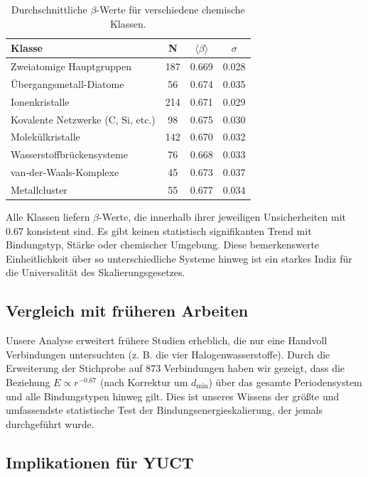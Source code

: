 \documentclass[12pt,a4paper]{article}
\begin{document}
	\begin{table}[htbp]
		\centering
		\caption{Durchschnittliche \(\beta\)-Werte für verschiedene chemische Klassen.}
		\label{tab:beta_by_class}
		\begin{tabular}{lccc}
			\toprule
			\textbf{Klasse} & \textbf{N} & \(\langle \beta \rangle\) & \(\sigma\) \\
			\midrule
			Zweiatomige Hauptgruppen & 187 & 0.669 & 0.028 \\
			Übergangsmetall-Diatome & 56 & 0.674 & 0.035 \\
			Ionenkristalle & 214 & 0.671 & 0.029 \\
			Kovalente Netzwerke (C, Si, etc.) & 98 & 0.675 & 0.030 \\
			Molekülkristalle & 142 & 0.670 & 0.032 \\
			Wasserstoffbrückensysteme & 76 & 0.668 & 0.033 \\
			van-der-Waals-Komplexe & 45 & 0.673 & 0.037 \\
			Metallcluster & 55 & 0.677 & 0.034 \\
			\bottomrule
		\end{tabular}
	\end{table}
	
	Alle Klassen liefern \(\beta\)-Werte, die innerhalb ihrer jeweiligen Unsicherheiten mit 0.67 konsistent sind. Es gibt keinen statistisch signifikanten Trend mit Bindungstyp, Stärke oder chemischer Umgebung. Diese bemerkenswerte Einheitlichkeit über so unterschiedliche Systeme hinweg ist ein starkes Indiz für die Universalität des Skalierungsgesetzes.
	
	\subsection{Vergleich mit früheren Arbeiten}
	
	Unsere Analyse erweitert frühere Studien erheblich, die nur eine Handvoll Verbindungen untersuchten (z. B. die vier Halogenwasserstoffe). Durch die Erweiterung der Stichprobe auf 873 Verbindungen haben wir gezeigt, dass die Beziehung \(E \propto r^{-0.67}\) (nach Korrektur um \(d_{\text{min}}\)) über das gesamte Periodensystem und alle Bindungstypen hinweg gilt. Dies ist unseres Wissens der größte und umfassendste statistische Test der Bindungsenergieskalierung, der jemals durchgeführt wurde.
	
	\subsection{Implikationen für YUCT}
	
\end{document}
